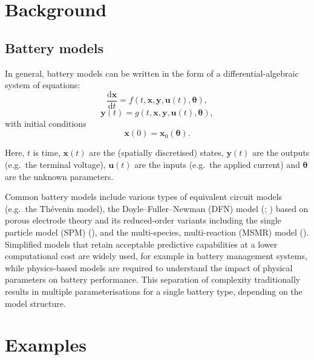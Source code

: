 \documentclass[
]{article}
\begin{document}
\section{Background}\label{background}

\subsection{Battery models}\label{battery-models}

In general, battery models can be written in the form of a
differential-algebraic system of equations: \begin{equation}
\frac{\mathrm{d} \mathbf{x}}{\mathrm{d} t} = f(t,\mathbf{x},\mathbf{y},\mathbf{u}(t),\mathbf{\theta}),
\label{dynamics}
\end{equation} \begin{equation}
\mathbf{y}(t) = g(t,\mathbf{x},\mathbf{y},\mathbf{u}(t),\mathbf{\theta}),
\label{output}
\end{equation} with initial conditions \begin{equation}
\mathbf{x}(0) = \mathbf{x}_0(\mathbf{\theta}).
\label{initial_conditions}
\end{equation}

Here, \(t\) is time, \(\mathbf{x}(t)\) are the (spatially discretised)
states, \(\mathbf{y}(t)\) are the outputs (e.g.~the terminal voltage),
\(\mathbf{u}(t)\) are the inputs (e.g.~the applied current) and
\(\mathbf{\theta}\) are the unknown parameters.

Common battery models include various types of equivalent circuit models
(e.g.~the Thévenin model), the Doyle--Fuller--Newman (DFN) model
(;
) based on porous
electrode theory and its reduced-order variants including the single
particle model (SPM) (), and the multi-species, multi-reaction (MSMR) model
(). Simplified
models that retain acceptable predictive capabilities at a lower
computational cost are widely used, for example in battery management
systems, while physics-based models are required to understand the
impact of physical parameters on battery performance. This separation of
complexity traditionally results in multiple parameterisations for a
single battery type, depending on the model structure.

\section{Examples}\label{examples}
\end{document}
